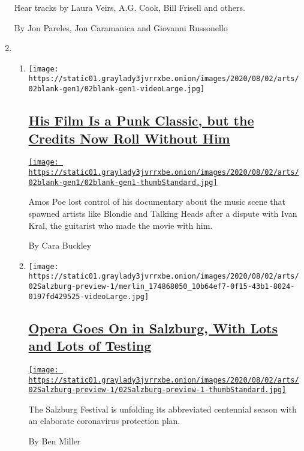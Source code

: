 \begin{enumerate}
  Hear tracks by Laura Veirs, A.G. Cook, Bill Frisell and others.

  By Jon Pareles, Jon Caramanica and Giovanni Russonello
\item
  \begin{enumerate}
  \def\labelenumii{\arabic{enumii}.}
  \item
    \texttt{[image: https://static01.graylady3jvrrxbe.onion/images/2020/08/02/arts/02blank-gen1/02blank-gen1-videoLarge.jpg]}

    \hypertarget{his-film-is-a-punk-classic-but-the-credits-now-roll-without-him}{%
    \subsection{\texorpdfstring{\href{/2020/07/30/movies/blank-generation-amos-poe.html}{His
    Film Is a Punk Classic, but the Credits Now Roll Without
    Him}}{His Film Is a Punk Classic, but the Credits Now Roll Without Him}}\label{his-film-is-a-punk-classic-but-the-credits-now-roll-without-him}}

    \href{/2020/07/30/movies/blank-generation-amos-poe.html}{\texttt{[image: https://static01.graylady3jvrrxbe.onion/images/2020/08/02/arts/02blank-gen1/02blank-gen1-thumbStandard.jpg]}}

    Amos Poe lost control of his documentary about the music scene that
    spawned artists like Blondie and Talking Heads after a dispute with
    Ivan Kral, the guitarist who made the movie with him.

    By Cara Buckley
  \item
    \texttt{[image: https://static01.graylady3jvrrxbe.onion/images/2020/08/02/arts/02Salzburg-preview-1/merlin\_174868050\_10b64ef7-0f15-43b1-8024-0197fd429525-videoLarge.jpg]}

    \hypertarget{opera-goes-on-in-salzburg-with-lots-and-lots-of-testing}{%
    \subsection{\texorpdfstring{\href{/2020/07/31/arts/music/salzburg-festival-coronavirus-cosi.html}{Opera
    Goes On in Salzburg, With Lots and Lots of
    Testing}}{Opera Goes On in Salzburg, With Lots and Lots of Testing}}\label{opera-goes-on-in-salzburg-with-lots-and-lots-of-testing}}

    \href{/2020/07/31/arts/music/salzburg-festival-coronavirus-cosi.html}{\texttt{[image: https://static01.graylady3jvrrxbe.onion/images/2020/08/02/arts/02Salzburg-preview-1/02Salzburg-preview-1-thumbStandard.jpg]}}

    The Salzburg Festival is unfolding its abbreviated centennial season
    with an elaborate coronavirus protection plan.

    By Ben Miller
  \end{enumerate}
\end{enumerate}

